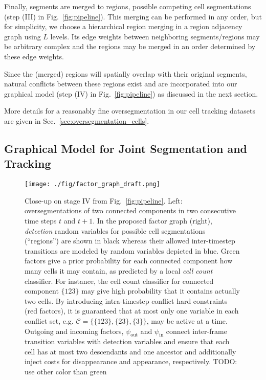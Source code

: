 \documentclass[10pt,twocolumn,letterpaper]{article}
\newcommand{\red}{\color{red}}
\begin{document}
Finally, segments are merged to regions, possible competing cell segmentations (step (III) in Fig.~\ref{fig:pipeline}).  
This merging can be performed in any order, but
for simplicity, we choose a hierarchical region merging in a region adjacency graph using $L$ levels. 
Its edge weights between neighboring segments/regions may be arbitrary complex and the regions may be merged 
in an order determined by these edge weights.

Since the (merged) regions will spatially overlap with their original segments, natural conflicts between 
these regions exist and are incorporated into our graphical model (step (IV) in Fig.~\ref{fig:pipeline})
as discussed in the next section.

More details for a reasonably fine oversegmentation in our 
cell tracking datasets are given in Sec.~\ref{sec:oversegmentation_cells}.


\subsection{Graphical Model for Joint Segmentation and Tracking}
\label{sec:joint}


\begin{figure}[t]
\begin{center}
   \texttt{[image: ./fig/factor\_graph\_draft.png]}
\end{center}
   \caption{Close-up on stage IV from Fig.~\ref{fig:pipeline}. Left: oversegmentations of two connected components in
two consecutive time steps $t$ and $t+1$. 
In the proposed factor graph (right), 
\emph{detection} random variables for possible cell segmentations (``regions'') 
are shown in black whereas their allowed inter-timestep transitions
are modeled by random variables depicted in blue.
Green factors give a prior probability for each connected component how many cells it may contain, as
predicted by a local \emph{cell count} classifier. 
For instance, the cell count classifier for connected component $\{123\}$ may give high probability that it contains
actually two cells.
By introducing intra-timestep conflict hard constraints (red factors), it is guaranteed that 
at most only one variable in each conflict set, e.g. $\mathcal C = \{ \{123\}, \{23\}, \{3\} \}$, may be active at a time.
Outgoing and incoming factors, $\psi_\mathrm{out}$ and $\psi_\mathrm{in}$ connect inter-frame transition variables with
detection variables and ensure that each cell has at most two descendants and one ancestor and additionally inject costs for disappearance
and appearance, respectively.
{\red TODO: use other color than green}}
\label{fig:factor_graph}
\end{figure}
\end{document}
